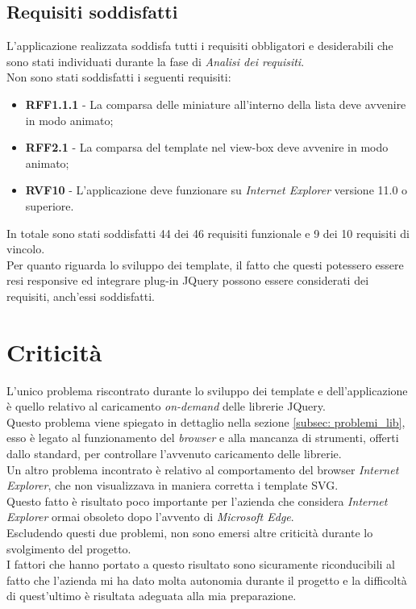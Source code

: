 \subsection{Requisiti soddisfatti}
L'applicazione realizzata soddisfa tutti i requisiti obbligatori e desiderabili che sono stati individuati durante la fase di \textit{Analisi dei requisiti}.\\
Non sono stati soddisfatti i seguenti requisiti:
\begin{itemize}
	\item \textbf{RFF1.1.1} - La comparsa delle miniature all'interno della lista deve avvenire in modo animato;
	\item \textbf{RFF2.1} - La comparsa del template nel view-box deve avvenire in modo animato;
	\item \textbf{RVF10} - L'applicazione deve funzionare su \textit{Internet Explorer} versione 11.0 o superiore.
\end{itemize}
In totale sono stati soddisfatti 44 dei 46 requisiti funzionale e 9 dei 10 requisiti di vincolo.\\
Per quanto riguarda lo sviluppo dei template, il fatto che questi potessero essere resi responsive ed integrare plug-in JQuery possono essere considerati dei requisiti, anch'essi soddisfatti.
\section{Criticità}
L'unico problema riscontrato durante lo sviluppo dei template e dell'applicazione è quello relativo al caricamento \textit{on-demand} delle librerie JQuery.\\
Questo problema viene spiegato in dettaglio nella sezione \ref{subsec: problemi_lib}, esso è legato al funzionamento del \textit{browser} e alla mancanza di strumenti, offerti dallo standard, per controllare l'avvenuto caricamento delle librerie.\\
Un altro problema incontrato è relativo al comportamento del browser \textit{Internet Explorer}, che non visualizzava in maniera corretta i template SVG.\\
Questo fatto è risultato poco importante per l'azienda che considera \textit{Internet Explorer} ormai obsoleto dopo l'avvento di \textit{Microsoft Edge}.\\
Escludendo questi due problemi, non sono emersi altre criticità durante lo svolgimento del progetto.\\
I fattori che hanno portato a questo risultato sono sicuramente riconducibili al fatto che l'azienda mi ha dato molta autonomia durante il progetto e la difficoltà di quest'ultimo è risultata adeguata alla mia preparazione.
 
